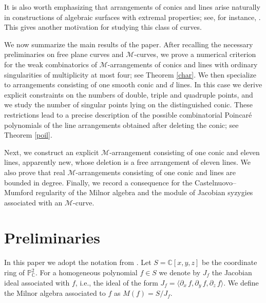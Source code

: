 \documentclass[11pt]{article}
\theoremstyle{plain}
\theoremstyle{definition}
\theoremstyle{remark}
\begin{document}
It is also worth emphasizing that arrangements of conics and lines arise naturally in
constructions of algebraic surfaces with extremal properties; see, for instance,
\cite{NP26, Pard, Pelka}. This gives another motivation for studying this class of curves.

We now summarize the main results of the paper. After recalling the necessary
preliminaries on free plane curves and \(\mathscr{M}\)-curves, we prove a numerical
criterion for the weak combinatorics of \(\mathscr{M}\)-arrangements of conics and
lines with ordinary singularities of multiplicity at most four; see Theorem
\ref{char}. We then specialize to arrangements consisting of one smooth conic and
\(d\) lines. In this case we derive explicit constraints on the numbers of double,
triple and quadruple points, and we study the number of singular points lying on the
distinguished conic. These restrictions lead to a precise description of the possible
combinatorial Poincar\'e polynomials of the line arrangements obtained after deleting
the conic; see Theorem \ref{poil}.

Next, we construct an explicit \(\mathscr{M}\)-arrangement consisting of one conic and
eleven lines, apparently new, whose deletion is a free arrangement of eleven lines. We
also prove that real \(\mathscr{M}\)-arrangements consisting of one conic and lines are
bounded in degree. Finally, we record a consequence for the Castelnuovo--Mumford
regularity of the Milnor algebra and the module of Jacobian syzygies associated with
an \(\mathscr{M}\)-curve.

\section{Preliminaries}
In this paper we adopt the notation from \cite{Dimca}. Let $S = \mathbb{C}[x,y,z]$ be the coordinate ring of $\mathbb{P}^{2}_{\mathbb{C}}$. For a homogeneous polynomial $f \in S$ we denote by $J_{f}$ the Jacobian ideal associated with $f$, i.e., the ideal of the form $J_{f} = \langle \partial_{x}\, f, \partial_{y} \, f, \partial_{z} \, f \rangle$. We define the Milnor algebra associated to $f$ as $M(f) = S/ J_{f}$. 
\end{document}
